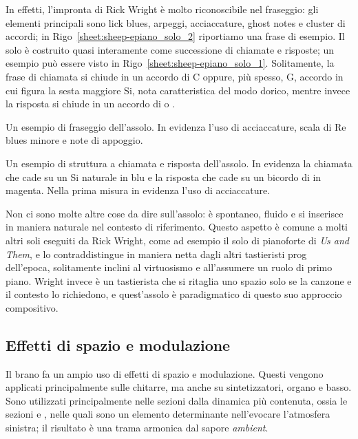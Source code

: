 \documentclass[class=book, crop=false, oneside, 12pt]{standalone}
\begin{document}
    In effetti, l'impronta di Rick Wright è molto riconoscibile nel fraseggio: gli elementi principali sono lick blues, arpeggi, acciaccature, ghost notes e cluster di accordi; in Rigo~\ref{sheet:sheep-epiano_solo_2} riportiamo una frase di esempio. Il solo è costruito quasi interamente come successione di chiamate e risposte; un esempio può essere visto in Rigo~\ref{sheet:sheep-epiano_solo_1}. Solitamente, la frase di chiamata si chiude in un accordo di C oppure, più spesso, G, accordo in cui figura la sesta maggiore Si, nota caratteristica del modo dorico, mentre invece la risposta si chiude in un accordo di  o . 

    \begin{sheet}[htb]
        \centering
        \caption[Un esempio di fraseggio dell'assolo.]{Un esempio di fraseggio dell'assolo. In evidenza l'uso di acciaccature, scala di Re blues minore e note di appoggio.}
        \label{sheet:sheep-epiano_solo_2}
    \end{sheet}

    \begin{sheet}[htb]
        \centering
        \caption[Un esempio di struttura a chiamata e risposta dell'assolo.]{Un esempio di struttura a chiamata e risposta dell'assolo. In evidenza la chiamata che cade su un Si naturale in blu e la risposta che cade su un bicordo di  in magenta. Nella prima misura in evidenza l'uso di acciaccature.}
        \label{sheet:sheep-epiano_solo_1}
    \end{sheet}

    Non ci sono molte altre cose da dire sull'assolo: è spontaneo, fluido e si inserisce in maniera naturale nel contesto di riferimento. Questo  aspetto è comune a molti altri soli eseguiti da Rick Wright, come ad esempio il solo di pianoforte di \emph{Us and Them}, e lo contraddistingue in maniera netta dagli altri tastieristi prog dell'epoca, solitamente inclini al virtuosismo e all'assumere un ruolo di primo piano. Wright invece è un tastierista che si ritaglia uno spazio solo se la canzone e il contesto lo richiedono, e quest'assolo è paradigmatico di questo suo approccio compositivo.


    \subsection{Effetti di spazio e modulazione}
    Il brano fa un ampio uso di effetti di spazio e modulazione. Questi vengono applicati principalmente sulle chitarre, ma anche su sintetizzatori, organo e basso. Sono utilizzati principalmente nelle sezioni dalla dinamica più contenuta, ossia le sezioni  e , nelle quali sono un elemento determinante nell'evocare l'atmosfera sinistra; il risultato è una trama armonica dal sapore \emph{ambient}.
\end{document}
